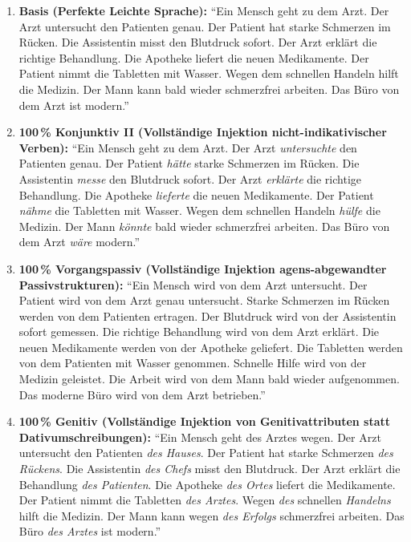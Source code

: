 \begin{enumerate}
    \item \textbf{Basis (Perfekte Leichte Sprache):}
    \enquote{Ein Mensch geht zu dem Arzt. Der Arzt untersucht den Patienten genau. Der Patient hat starke Schmerzen im Rücken. Die Assistentin misst den Blutdruck sofort. Der Arzt erklärt die richtige Behandlung. Die Apotheke liefert die neuen Medikamente. Der Patient nimmt die Tabletten mit Wasser. Wegen dem schnellen Handeln hilft die Medizin. Der Mann kann bald wieder schmerzfrei arbeiten. Das Büro von dem Arzt ist modern.}
    
    \item \textbf{100\,\% Konjunktiv II (Vollständige Injektion nicht-indikativischer Verben):}
    \enquote{Ein Mensch geht zu dem Arzt. Der Arzt \textit{untersuchte} den Patienten genau. Der Patient \textit{hätte} starke Schmerzen im Rücken. Die Assistentin \textit{messe} den Blutdruck sofort. Der Arzt \textit{erklärte} die richtige Behandlung. Die Apotheke \textit{lieferte} die neuen Medikamente. Der Patient \textit{nähme} die Tabletten mit Wasser. Wegen dem schnellen Handeln \textit{hülfe} die Medizin. Der Mann \textit{könnte} bald wieder schmerzfrei arbeiten. Das Büro von dem Arzt \textit{wäre} modern.}
    
    \item \textbf{100\,\% Vorgangspassiv (Vollständige Injektion agens-abgewandter Passivstrukturen):}
    \enquote{Ein Mensch wird von dem Arzt untersucht. Der Patient wird von dem Arzt genau untersucht. Starke Schmerzen im Rücken werden von dem Patienten ertragen. Der Blutdruck wird von der Assistentin sofort gemessen. Die richtige Behandlung wird von dem Arzt erklärt. Die neuen Medikamente werden von der Apotheke geliefert. Die Tabletten werden von dem Patienten mit Wasser genommen. Schnelle Hilfe wird von der Medizin geleistet. Die Arbeit wird von dem Mann bald wieder aufgenommen. Das moderne Büro wird von dem Arzt betrieben.}
    
    \item \textbf{100\,\% Genitiv (Vollständige Injektion von Genitivattributen statt Dativumschreibungen):}
    \enquote{Ein Mensch geht des Arztes wegen. Der Arzt untersucht den Patienten \textit{des Hauses}. Der Patient hat starke Schmerzen \textit{des Rückens}. Die Assistentin \textit{des Chefs} misst den Blutdruck. Der Arzt erklärt die Behandlung \textit{des Patienten}. Die Apotheke \textit{des Ortes} liefert die Medikamente. Der Patient nimmt die Tabletten \textit{des Arztes}. Wegen \textit{des} schnellen \textit{Handelns} hilft die Medizin. Der Mann kann wegen \textit{des Erfolgs} schmerzfrei arbeiten. Das Büro \textit{des Arztes} ist modern.}
    

\end{enumerate}
